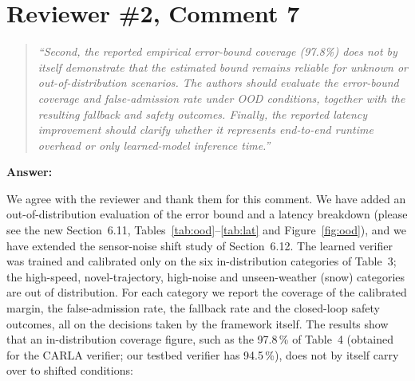\documentclass[11pt]{article}
\newenvironment{revcomment}{\begin{quote}\itshape}{\end{quote}}
\newcommand{\answerhead}[1]{\par\medskip\noindent\textbf{#1}\par}
\begin{document}
\section*{Reviewer \#2, Comment 7}
\begin{revcomment}
``Second, the reported empirical error-bound coverage (97.8\%) does not by itself demonstrate that the estimated bound remains
reliable for unknown or out-of-distribution scenarios. The authors should evaluate the error-bound coverage and false-admission
rate under OOD conditions, together with the resulting fallback and safety outcomes. Finally, the reported latency improvement
should clarify whether it represents end-to-end runtime overhead or only learned-model inference time.''
\end{revcomment}
\answerhead{Answer:}
We agree with the reviewer and thank them for this comment. We have added an out-of-distribution evaluation of the error bound
and a latency breakdown (please see the new Section~6.11, Tables~\ref{tab:ood}--\ref{tab:lat} and Figure~\ref{fig:ood}), and we
have extended the sensor-noise shift study of Section~6.12. The learned verifier was trained and calibrated only on the six
in-distribution categories of Table~3; the high-speed, novel-trajectory, high-noise and unseen-weather (snow) categories are out
of distribution. For each category we report the coverage of the calibrated margin, the false-admission rate, the fallback rate
and the closed-loop safety outcomes, all on the decisions taken by the framework itself. The results show that an in-distribution coverage
figure, such as the 97.8\,\% of Table~4 (obtained for the CARLA verifier; our testbed verifier has 94.5\,\%), does not by itself carry over to
shifted conditions:
\end{document}
